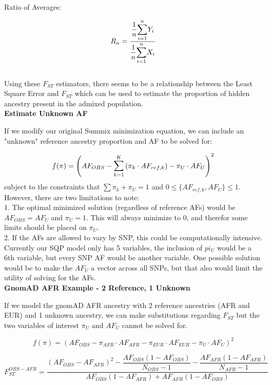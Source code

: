 \documentclass[11pt,a4paper]{article}
\begin{document}
Ratio of Averages:

$$ R_n = \dfrac{\dfrac{1}{n} \mathlarger{\sum}_{i=1}^n Y_i}{\dfrac{1}{n} \mathlarger{\sum}_{i=1}^n X_i} $$\\

Using these $F_{ST}$ estimators, there seems to be a relationship between the Least Square Error and $F_{ST}$ which can be used to estimate the proportion of hidden ancestry present in the admixed population.\\

\textbf{Estimate Unknown AF}

If we modify our original Summix minimization equation, we can include an "unknown" reference ancestry proportion and AF to be solved for:

$$ f(\pi) = \left( AF_{OBS} - \mathlarger{\sum}_{k=1}^K \left( \pi_k \cdot AF_{ref,k} \right) - \pi_U \cdot AF_U \right)^2$$
subject to the constraints that $\sum \pi_k + \pi_U = 1$ and $0 \leq \lbrace AF_{ref,k}, AF_U \rbrace \leq 1$.\\

However, there are two limitations to note:\\

1. The optimal minimized solution (regardless of reference AFs) would be $AF_{OBS} = AF_U$ and $\pi_U = 1$. This will always minimize to 0, and therefor some limits should be placed on $\pi_U$.\\

2. If the AFs are allowed to vary by SNP, this could be computationally intensive.  Currently our SQP model only has 5 variables, the inclusion of $pi_U$ would be a 6th variable, but every SNP AF would be another variable. One possible solution would be to make the $AF_U$ a vector across all SNPs, but that also would limit the utility of solving for the AFs.\\

\textbf{GnomAD AFR Example - 2 Reference, 1 Unknown}

If we model the gnomAD AFR ancestry with 2 reference ancestries (AFR and EUR) and 1 unknown ancestry, we can make substitutions regarding $F_{ST}$ but the two variables of interest $\pi_U$ and $AF_U$ cannot be solved for.

$$f(\pi) = \left( AF_{OBS} - \pi_{AFR} \cdot AF_{AFR} - \pi_{EUR} \cdot AF_{EUR} - \pi_{U} \cdot AF_{U} \right)^2 $$

$$F_{ST}^{OBS-AFR} =  \dfrac{ \left( AF_{OBS} - AF_{AFR} \right)^2 - \dfrac{AF_{OBS} \left( 1 - AF_{OBS} \right)}{N_{OBS} - 1} - \dfrac{AF_{AFR} \left( 1 - AF_{AFR} \right)}{N_{AFR} - 1} }{AF_{OBS} \left( 1 - AF_{AFR} \right) + AF_{AFR} \left( 1 - AF_{OBS} \right)}$$
\end{document}
